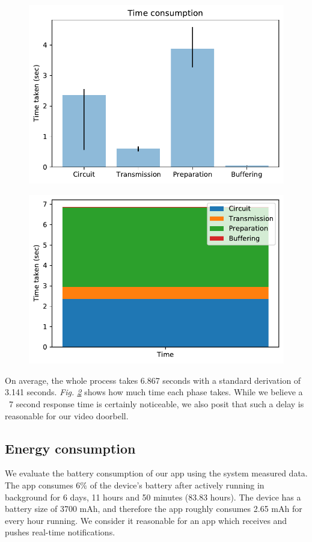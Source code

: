 \begin{figure}
	\includegraphics[width=\linewidth]{plot1.pdf}
	\caption{}
	\label{fig:timeconsumption}
\end{figure}

\begin{figure}
	\includegraphics[width=\linewidth]{plot2.pdf}
	\caption{}
	\label{fig:timepercentage}
\end{figure}

On average, the whole process takes 6.867 seconds with a standard derivation of 3.141 seconds. \textit{Fig. \ref{fig:timepercentage}} shows how much time each phase takes. While we believe a ~7 second response time is certainly noticeable, we also posit that such a delay is reasonable for our video doorbell.


\subsection{Energy consumption}
We evaluate the battery consumption of our app using the system measured data. The app consumes 6\% of the device's battery after actively running in background for 6 days, 11 hours and 50 minutes (83.83 hours). The device has a battery size of 3700 mAh, and therefore the app roughly consumes 2.65 mAh for every hour running. We consider it reasonable for an app which receives and pushes real-time notifications.

